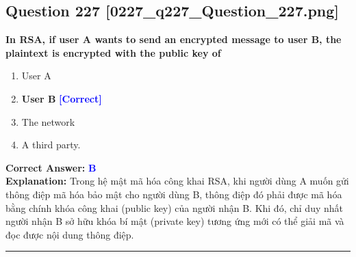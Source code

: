 \documentclass[11pt,a4paper]{article}
\begin{document}
\begin{minipage}{\textwidth}
\subsection*{Question 227 \quad \footnotesize{[0227\_q227\_Question\_227.png]}}
\noindent \textbf{In RSA, if user A wants to send an encrypted message to user B, the plaintext is encrypted with the public key of}

\begin{enumerate}[label=\Alph*.]
    \item User A
    \item \textbf{User B} \hfill \textcolor{blue}{\textbf{[Correct]}}
    \item The network
    \item A third party.
\end{enumerate}

\noindent \textbf{Correct Answer:} \textcolor{blue}{\textbf{B}} \\[2pt]
\noindent \textbf{Explanation:} Trong hệ mật mã hóa công khai RSA, khi người dùng A muốn gửi thông điệp mã hóa bảo mật cho người dùng B, thông điệp đó phải được mã hóa bằng chính khóa công khai (public key) của người nhận B. Khi đó, chỉ duy nhất người nhận B sở hữu khóa bí mật (private key) tương ứng mới có thể giải mã và đọc được nội dung thông điệp.

\par\vspace{0.3cm}
\hrule
\vspace{0.3cm}
\end{minipage}
\end{document}

